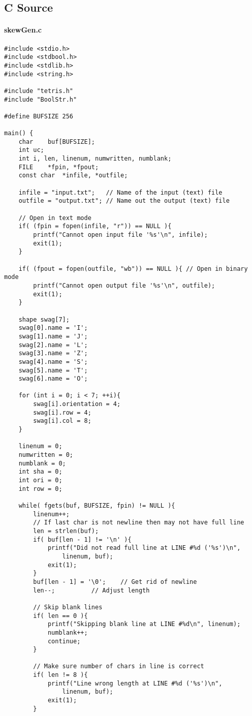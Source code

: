 \documentclass[letterpaper,titlepage,oneside]{article}
\begin{document}
\clearpage

\subsection{C Source}
\paragraph*{skewGen.c\\}
\label{code: skewGen.c}
\begin{lstlisting}
#include <stdio.h>
#include <stdbool.h>
#include <stdlib.h>
#include <string.h>

#include "tetris.h"
#include "BoolStr.h"

#define BUFSIZE 256

main() {
	char	buf[BUFSIZE];
	int	uc;
	int	i, len, linenum, numwritten, numblank;
	FILE	*fpin, *fpout;
	const char	*infile, *outfile;

	infile = "input.txt";	// Name of the input (text) file
	outfile = "output.txt"; // Name out the output (text) file
	
	// Open in text mode
	if( (fpin = fopen(infile, "r")) == NULL ){ 
		printf("Cannot open input file '%s'\n", infile);
		exit(1);
	}

	if( (fpout = fopen(outfile, "wb")) == NULL ){ // Open in binary mode
		printf("Cannot open output file '%s'\n", outfile);
		exit(1);
	}

	shape swag[7];
	swag[0].name = 'I';
	swag[1].name = 'J';
	swag[2].name = 'L';
	swag[3].name = 'Z';
	swag[4].name = 'S';
	swag[5].name = 'T';
	swag[6].name = 'O';

	for (int i = 0; i < 7; ++i){
		swag[i].orientation = 4;
		swag[i].row = 4;
		swag[i].col = 8;
	}

	linenum = 0;
	numwritten = 0;
	numblank = 0;
	int sha = 0;
	int ori = 0;
	int row = 0;

	while( fgets(buf, BUFSIZE, fpin) != NULL ){
		linenum++;
		// If last char is not newline then may not have full line
		len = strlen(buf);
		if( buf[len - 1] != '\n' ){
			printf("Did not read full line at LINE #%d ('%s')\n",
				linenum, buf);
			exit(1);
		}
		buf[len - 1] = '\0';	// Get rid of newline
		len--;			// Adjust length

		// Skip blank lines
		if( len == 0 ){	
			printf("Skipping blank line at LINE #%d\n", linenum);
			numblank++;
			continue;
		}

		// Make sure number of chars in line is correct
		if( len != 8 ){
			printf("Line wrong length at LINE #%d ('%s')\n",
				linenum, buf);
			exit(1);
		}


\end{lstlisting}
\end{document}
